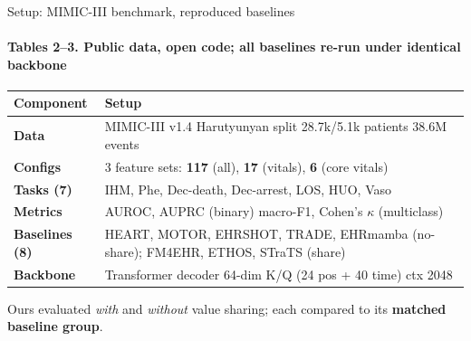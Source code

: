 \documentclass[10pt, aspectratio=169, t]{beamer}   %
\newcommand{\good}[1]{{\color{posblue}\bfseries #1}}  %
\newcommand{\figcap}[1]{{\color{muted}\scriptsize #1}}
\begin{document}
\begin{frame}{Setup: MIMIC-III benchmark, reproduced baselines}
  \framesubtitle{Tables 2--3. Public data, open code; all baselines re-run under identical backbone}
  \vfill
  \begin{center}
  \renewcommand{\arraystretch}{1.4}
  \setlength{\tabcolsep}{5pt}
  \begin{tabular}{@{}>{\bfseries}l p{}@{}}
    \toprule
    \normalfont\textbf{Component} & \textbf{Setup}\\
    \midrule
    Data & MIMIC-III v1.4 \textperiodcentered{} Harutyunyan split \textperiodcentered{} 28.7k/5.1k patients \textperiodcentered{} 38.6M events\\
    Configs & 3 feature sets: \textbf{117} (all), \textbf{17} (vitals), \textbf{6} (core vitals)\\
    Tasks (7) & IHM, Phe, Dec-death, Dec-arrest, LOS, HUO, Vaso\\
    Metrics & AUROC, AUPRC (binary) \textperiodcentered{} macro-F1, Cohen's $\kappa$ (multiclass)\\
    Baselines (8) & HEART, MOTOR, EHRSHOT, TRADE, EHRmamba (no-share); FM4EHR, ETHOS, STraTS (share)\\
    Backbone & Transformer decoder \textperiodcentered{} 64-dim K/Q (24 pos + 40 time) \textperiodcentered{} ctx 2048\\
    \bottomrule
  \end{tabular}
  \end{center}
  \vfill
  \figcap{\;\;Ours evaluated \emph{with} and \emph{without} value sharing; each compared to its \good{matched baseline group}.}
  \vfill
\end{frame}
\end{document}
